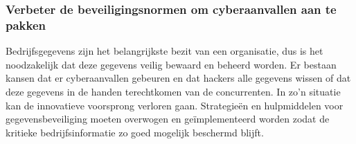 
\subsubsection{Verbeter de beveiligingsnormen om cyberaanvallen aan te pakken}
Bedrijfsgegevens zijn het belangrijkste bezit van een organisatie, dus is het noodzakelijk dat deze gegevens veilig bewaard en beheerd worden. Er bestaan kansen dat er cyberaanvallen gebeuren en dat hackers alle gegevens wissen of dat deze gegevens in de handen terechtkomen van de concurrenten. In zo’n situatie kan de innovatieve voorsprong verloren gaan. Strategieën en hulpmiddelen voor gegevensbeveiliging moeten overwogen en geïmplementeerd worden zodat de kritieke bedrijfsinformatie zo goed mogelijk beschermd blijft. 

